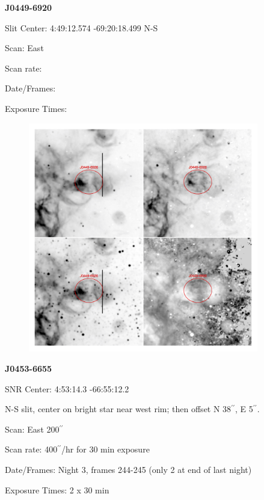 \documentclass[11pt]{article}
\newcommand{\arcsec}{$^{\prime\prime}$}
\begin{document}
\newpage
{\bf J0449-6920}

Slit Center:   4:49:12.574     -69:20:18.499     N-S

Scan:  East

Scan rate:  

Date/Frames:

Exposure Times:  

\begin{figure}
\includegraphics[width=10.05cm]{snapshots/J0449-6920.png}
\end{figure}

\newpage
{\bf J0453-6655}

SNR Center:   4:53:14.3   -66:55:12.2     

N-S slit, center on bright star near west rim; then offset N 38$^{\prime\prime}$, E 5\arcsec.

Scan:  East  200$^{\prime\prime}$

Scan rate:  400$^{\prime\prime}$/hr for 30 min exposure

Date/Frames:  Night 3, frames 244-245 (only 2 at end of last night)

Exposure Times:  2 x 30 min
\end{document}
